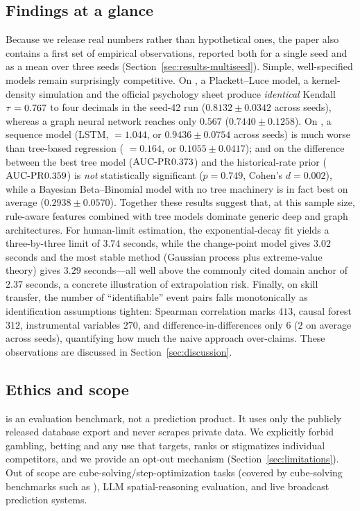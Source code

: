 \subsection{Findings at a glance}
\label{sec:findings}

Because we release real numbers rather than hypothetical ones, the paper also
contains a first set of empirical observations, reported both for a single
seed and as a mean over three seeds (Section~\ref{sec:results-multiseed}).
Simple, well-specified models remain surprisingly competitive. On , a
Plackett--Luce model, a kernel-density simulation and the official psychology
sheet produce \emph{identical} Kendall $\tau=0.767$ to four decimals in the
seed-42 run ($0.8132\pm0.0342$ across seeds), whereas a graph neural network
reaches only $0.567$ ($0.7440\pm0.1258$). On , a sequence model (LSTM,
\maelog{} $=1.044$, or $0.9436\pm0.0754$ across seeds) is much worse than
tree-based regression (\maelog{} $=0.164$, or $0.1055\pm0.0417$); and on
 the difference between the best tree model ($\mathrm{AUC\text{-}PR}{} 0.373$) and the
historical-rate prior ($\mathrm{AUC\text{-}PR}{} 0.359$) is \emph{not} statistically
significant ($p=0.749$, Cohen's $d=0.002$), while a Bayesian Beta--Binomial
model with no tree machinery is in fact best on average
($0.2938\pm0.0570$). Together these results suggest that, at this sample size,
rule-aware features combined with tree models dominate generic deep and graph
architectures. For human-limit estimation, the exponential-decay fit yields a
three-by-three limit of $3.74$ seconds, while the change-point model gives
$3.02$ seconds and the most stable method (Gaussian process plus extreme-value
theory) gives $3.29$ seconds---all well above the commonly cited domain anchor
of $2.37$ seconds, a concrete illustration of extrapolation risk. Finally, on
skill transfer, the number of ``identifiable'' event pairs falls monotonically
as identification assumptions tighten: Spearman correlation marks $413$, causal
forest $312$, instrumental variables $270$, and difference-in-differences only
$6$ ($2$ on average across seeds), quantifying how much the naive approach
over-claims. These observations are discussed in Section~\ref{sec:discussion}.

\subsection{Ethics and scope}
\label{sec:scope}

\wcabench{} is an evaluation benchmark, not a prediction product. It uses only
the publicly released \wca{} database export and never scrapes private data. We
explicitly forbid gambling, betting and any use that targets, ranks or
stigmatizes individual competitors, and we provide an opt-out mechanism
(Section~\ref{sec:limitations}). Out of scope are cube-solving/step-optimization
tasks (covered by cube-solving benchmarks such as \citep{cubebench, cube_bench_mllm}), LLM spatial-reasoning
evaluation, and live broadcast prediction systems.
